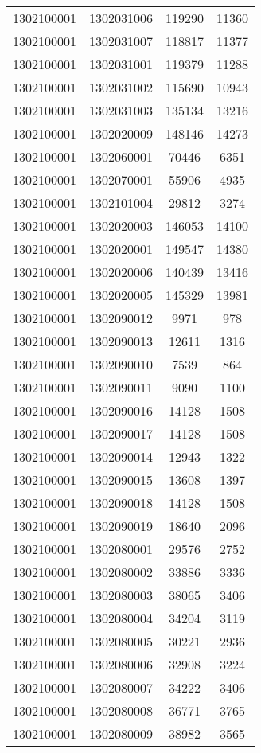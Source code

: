 \begin{longtable}[h]{llcc}
		1302100001 & 1302031006 & 119290 & 11360\\
		1302100001 & 1302031007 & 118817 & 11377\\
		1302100001 & 1302031001 & 119379 & 11288\\
		1302100001 & 1302031002 & 115690 & 10943\\
		1302100001 & 1302031003 & 135134 & 13216\\
		1302100001 & 1302020009 & 148146 & 14273\\
		1302100001 & 1302060001 & 70446 & 6351\\
		1302100001 & 1302070001 & 55906 & 4935\\
		1302100001 & 1302101004 & 29812 & 3274\\
		1302100001 & 1302020003 & 146053 & 14100\\
		1302100001 & 1302020001 & 149547 & 14380\\
		1302100001 & 1302020006 & 140439 & 13416\\
		1302100001 & 1302020005 & 145329 & 13981\\
		1302100001 & 1302090012 & 9971 & 978\\
		1302100001 & 1302090013 & 12611 & 1316\\
		1302100001 & 1302090010 & 7539 & 864\\
		1302100001 & 1302090011 & 9090 & 1100\\
		1302100001 & 1302090016 & 14128 & 1508\\
		1302100001 & 1302090017 & 14128 & 1508\\
		1302100001 & 1302090014 & 12943 & 1322\\
		1302100001 & 1302090015 & 13608 & 1397\\
		1302100001 & 1302090018 & 14128 & 1508\\
		1302100001 & 1302090019 & 18640 & 2096\\
		1302100001 & 1302080001 & 29576 & 2752\\
		1302100001 & 1302080002 & 33886 & 3336\\
		1302100001 & 1302080003 & 38065 & 3406\\
		1302100001 & 1302080004 & 34204 & 3119\\
		1302100001 & 1302080005 & 30221 & 2936\\
		1302100001 & 1302080006 & 32908 & 3224\\
		1302100001 & 1302080007 & 34222 & 3406\\
		1302100001 & 1302080008 & 36771 & 3765\\
		1302100001 & 1302080009 & 38982 & 3565\\

\end{longtable}
